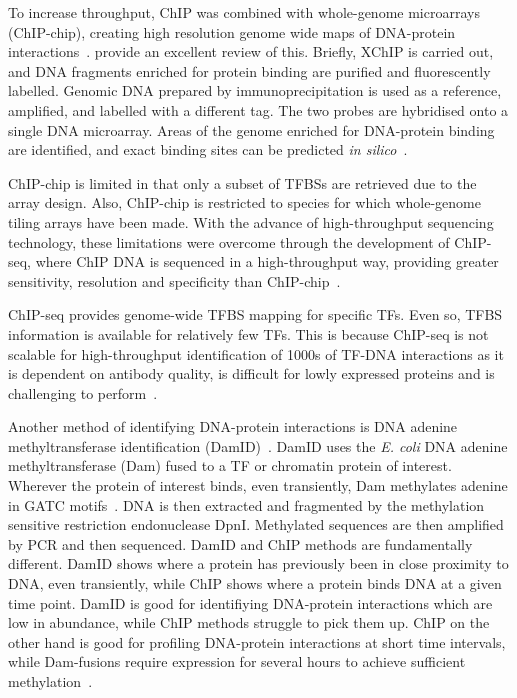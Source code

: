 To increase throughput, ChIP was combined with whole\hyp{}genome microarrays (ChIP\hyp{}chip), creating high resolution genome wide maps of DNA\hyp{}protein interactions~\autocite{weinmannIsolatingHumanTranscription2002,wellsIdentificationNovelPRb2003,renGenomeWideLocationFunction2000}.
\textcite*{buckChIPchipConsiderationsDesign2004} provide an excellent review of this.
Briefly, XChIP is carried out, and DNA fragments enriched for protein binding are purified and fluorescently labelled.
Genomic DNA prepared by immunoprecipitation is used as a reference, amplified, and labelled with a different tag.
The two probes are hybridised onto a single DNA microarray.
Areas of the genome enriched for DNA\hyp{}protein binding are identified, and exact binding sites can be predicted \textit{in silico}~\autocite{liuAlgorithmFindingProtein2002}.

ChIP\hyp{}chip is limited in that only a subset of TFBSs are retrieved due to the array design.
Also, ChIP\hyp{}chip is restricted to species for which whole\hyp{}genome tiling arrays have been made.
With the advance of high\hyp{}throughput sequencing technology, these limitations were overcome through the development of ChIP\hyp{}seq, where ChIP DNA is sequenced in a high\hyp{}throughput way, providing greater sensitivity, resolution and specificity than ChIP\hyp{}chip~\autocite{johnsonGenomeWideMappingVivo2007}.

ChIP\hyp{}seq provides genome\hyp{}wide TFBS mapping for specific TFs.
Even so, TFBS information is available for relatively few TFs.
This is because ChIP\hyp{}seq is not scalable for high\hyp{}throughput identification of 1000s of TF\hyp{}DNA interactions as it is dependent on antibody quality, is difficult for lowly expressed proteins and is challenging to perform~\autocite{kidderChIPSeqTechnicalConsiderations2011}.

Another method of identifying DNA-protein interactions is DNA adenine methyltransferase identification (DamID)~\autocite{steenselIdentificationVivoDNA2000}. DamID uses the \textit{E. coli} DNA adenine methyltransferase (Dam) fused to a TF or chromatin protein of interest.
Wherever the protein of interest binds, even transiently, Dam methylates adenine in GATC motifs~\autocite{sanchez-romeroDNAMethylationBacteria2015}.
DNA is then extracted and fragmented by the methylation sensitive restriction endonuclease DpnI.
Methylated sequences are then amplified by PCR and then sequenced.
DamID and ChIP methods are fundamentally different.
DamID shows where a protein has previously been in close proximity to DNA, even transiently, while ChIP shows where a protein binds DNA at a given time point.
DamID is good for identifiying DNA-protein interactions which are low in abundance, while ChIP methods struggle to pick them up.
ChIP on the other hand is good for profiling DNA-protein interactions at short time intervals, while Dam-fusions require expression for several hours to achieve sufficient methylation~\autocite{augheyDamItGood2016}.

